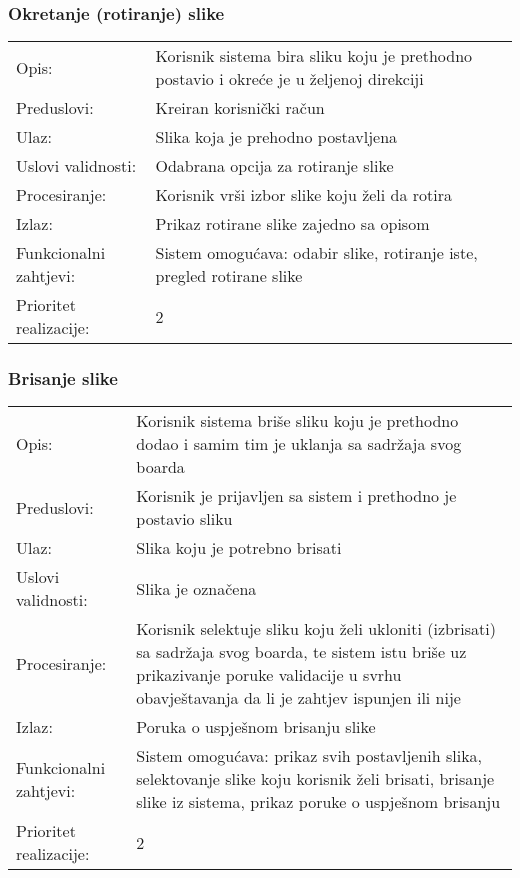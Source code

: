 \subsubsection{Okretanje (rotiranje) slike}

\begin{tabu} to 1.2
 Opis: & Korisnik sistema bira sliku koju je prethodno postavio i okreće je u željenoj direkciji\\
Preduslovi: & Kreiran korisnički račun \\
Ulaz: & Slika koja je prehodno postavljena \\
Uslovi validnosti: & Odabrana opcija za rotiranje slike \\
Procesiranje: & Korisnik vrši izbor slike koju želi da rotira \\
Izlaz: & Prikaz rotirane slike zajedno sa opisom \\
Funkcionalni zahtjevi: & Sistem omogućava: odabir slike, rotiranje iste, pregled rotirane slike \\
Prioritet realizacije: & 2

\end{tabu}
\newpage
\subsubsection{Brisanje slike}

\begin{tabu} to 1.2
Opis: & Korisnik sistema briše sliku koju je prethodno dodao i samim tim je uklanja sa sadržaja svog boarda \\
Preduslovi: & Korisnik je prijavljen sa sistem i prethodno je postavio sliku \\
Ulaz: & Slika koju je potrebno brisati \\
Uslovi validnosti: & Slika je označena \\
Procesiranje: & Korisnik selektuje sliku koju želi ukloniti (izbrisati) sa sadržaja svog boarda, te sistem istu briše uz prikazivanje poruke validacije u svrhu obavještavanja da li je zahtjev ispunjen ili nije \\
Izlaz: & Poruka o uspješnom brisanju slike \\
Funkcionalni zahtjevi: & Sistem omogućava: prikaz svih postavljenih slika, selektovanje slike koju korisnik želi brisati, brisanje slike iz sistema, prikaz poruke o uspješnom brisanju \\
Prioritet realizacije: & 2

\end{tabu}
\newpage
